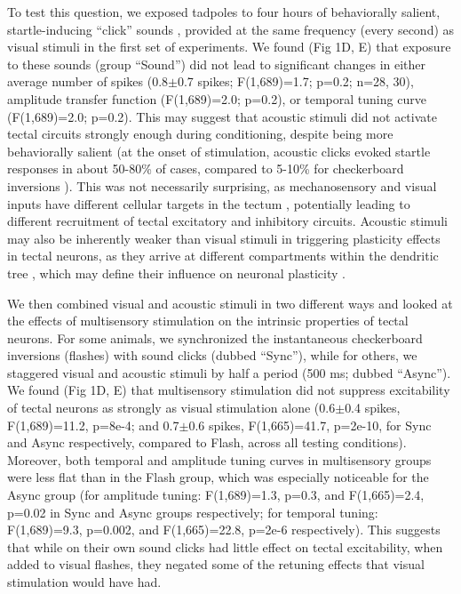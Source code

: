 \documentclass{article}
\begin{document}
To test this question, we exposed tadpoles to four hours of behaviorally salient, startle-inducing “click” sounds \citep{james2015,truszkowski2017}, provided at the same frequency (every second) as visual stimuli in the first set of experiments. We found (Fig 1D, E) that exposure to these sounds (group “Sound”) did not lead to significant changes in either average number of spikes (0.8$\pm$0.7 spikes; F(1,689)=1.7; p=0.2; n=28, 30), amplitude transfer function (F(1,689)=2.0; p=0.2), or temporal tuning curve (F(1,689)=2.0; p=0.2). This may suggest that acoustic stimuli did not activate tectal circuits strongly enough during conditioning, despite being more behaviorally salient (at the onset of stimulation, acoustic clicks evoked startle responses in about 50-80\% of cases, compared to 5-10\% for checkerboard inversions \citep{james2015, truszkowski2017}). This was not necessarily surprising, as mechanosensory and visual inputs have different cellular targets in the tectum \citep{pratt2009trigeminal, felch2016, truszkowski2017}, potentially leading to different recruitment of tectal excitatory and inhibitory circuits. Acoustic stimuli may also be inherently weaker than visual stimuli in triggering plasticity effects in tectal neurons, as they arrive at different compartments within the dendritic tree \citep{hiramoto2009, deeg2009}, which may define their influence on neuronal plasticity \citep{richards2019dendritic}.

We then combined visual and acoustic stimuli in two different ways and looked at the effects of multisensory stimulation on the intrinsic properties of tectal neurons. For some animals, we synchronized the instantaneous checkerboard inversions (flashes) with sound clicks (dubbed “Sync”), while for others, we staggered visual and acoustic stimuli by half a period (500 ms; dubbed “Async”). We found (Fig 1D, E) that multisensory stimulation did not suppress excitability of tectal neurons as strongly as visual stimulation alone (0.6$\pm$0.4 spikes, F(1,689)=11.2, p=8e-4; and 0.7$\pm$0.6 spikes, F(1,665)=41.7, p=2e-10, for Sync and Async respectively, compared to Flash, across all testing conditions). Moreover, both temporal and amplitude tuning curves in multisensory groups were less flat than in the Flash group, which was especially noticeable for the Async group (for amplitude tuning: F(1,689)=1.3, p=0.3, and F(1,665)=2.4, p=0.02 in Sync and Async groups respectively; for temporal tuning: F(1,689)=9.3, p=0.002, and F(1,665)=22.8, p=2e-6 respectively). This suggests that while on their own sound clicks had little effect on tectal excitability, when added to visual flashes, they negated some of the retuning effects that visual stimulation would have had.
\end{document}
